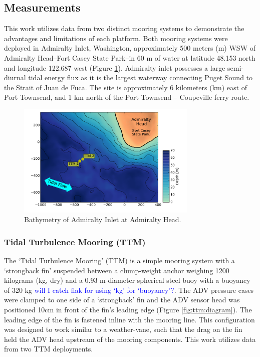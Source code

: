 \documentclass[twocol]{ametsoc}
\newcommand{\note}[1]{\textcolor{blue}{#1}}
\begin{document}
\subsection{Measurements}

This work utilizes data from two distinct mooring systems to demonstrate the advantages and limitations of each platform. Both mooring systems were deployed in Admiralty Inlet, Washington, approximately 500 meters (m) WSW of Admiralty Head--Fort Casey State Park--in 60 m of water at latitude 48.153 north and longitude 122.687 west (Figure \ref{fig:map}). Admiralty inlet possesses a large semi-diurnal tidal energy flux as it is the largest waterway connecting Puget Sound to the Strait of Juan de Fuca. The site is approximately 6 kilometers (km) east of Port Townsend, and 1 km north of the Port Townsend -- Coupeville ferry route.

\begin{figure}[t]
  \centering
  \includegraphics[width=3.4in]{map02}
  \caption{Bathymetry of Admiralty Inlet at Admiralty Head.}
  \label{fig:map}
\end{figure}

\subsubsection{Tidal Turbulence Mooring (TTM)}

The `Tidal Turbulence Mooring' (TTM) is a simple mooring system with a `strongback fin' suspended between a clump-weight anchor weighing 1200 kilograms (kg, dry) and a 0.93 m-diameter spherical steel buoy with a buoyancy of 320 kg \note{will I catch flak for using `kg' for `buoyancy'?}. The ADV pressure cases were clamped to one side of a `strongback' fin and the ADV sensor head was positioned 10cm in front of the fin's leading edge (Figure \ref{fig:ttm:diagram}). The leading edge of the fin is fastened inline with the mooring line. This configuration  was designed to work similar to a weather-vane, such that the drag on the fin held the ADV head upstream of the mooring components.  This work utilizes data from two TTM deployments. 
\end{document}
